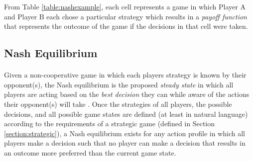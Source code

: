 \noindent From Table \ref{table:nashexample}, each cell represents a game in which Player A and Player B each chose a particular strategy which results in a \textit{payoff function} that represents the outcome of the game if the decisions in that cell were taken.

\subsection{Nash Equilibrium} \label{section:nash}

\paragraph{} Given a non-cooperative game in which each players strategy is known by their opponent(s), the Nash equilibrium is the proposed \textit{steady state} in which all players are acting based on the \textit{best decision} they can while aware of the actions their opponent(s) will take \cite[Section 2.2]{osborne1994}. Once the strategies of all players, the possible decisions, and all possible game states are defined (at least in natural language) according to the requirements of a strategic game (defined in Section \ref{section:strategic}), a Nash equilibrium exists for any action profile in which all players make a decision such that no player can make a decision that results in an outcome more preferred than the current game state.
